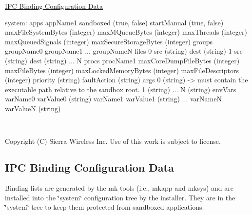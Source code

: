\hyperlink{howToConfigTreeSchema_bindingConfig}{I\+P\+C Binding Configuration Data}

\begin{DoxyVerb}system:
    apps
          appName1
              sandboxed (true, false)
              startManual (true, false)
              maxFileSystemBytes (integer)
              maxMQueueBytes (integer)
              maxThreads (integer)
              maxQueuedSignals (integer)
              maxSecureStorageBytes (integer)
              groups
                  groupName0
                  groupName1
                  ...
                  groupNameN
              files
                 0
                      src (string)
                      dest (string)
                  1
                      src (string)
                      dest (string)
                  ...
                  N
              procs
                  procName1
                      maxCoreDumpFileBytes (integer)
                      maxFileBytes (integer)
                      maxLockedMemoryBytes (integer)
                      maxFileDescriptors (integer)
                      priority (string)
                      faultAction (string)
                      args
                          0 (string) -> must contain the executable path relative to the sandbox root.
                          1 (string)
                          ...
                          N (string)
                      envVars
                          varName0
                              varValue0 (string)
                          varName1
                              varValue1 (string)
                          ...
                          varNameN
                              varValueN (string)
\end{DoxyVerb}
 ~\newline






Copyright (C) Sierra Wireless Inc. Use of this work is subject to license. \hypertarget{howToConfigTreeSchema_bindingConfig}{}\subsection{I\+P\+C Binding Configuration Data}\label{howToConfigTreeSchema_bindingConfig}
Binding lists are generated by the mk tools (i.\+e., mkapp and mksys) and are installed into the \char`\"{}system\char`\"{} configuration tree by the installer. They are in the \char`\"{}system\char`\"{} tree to keep them protected from sandboxed applications.

